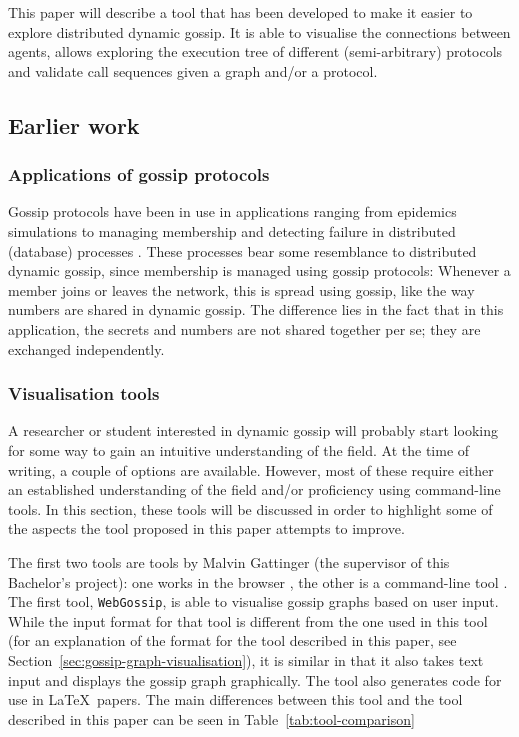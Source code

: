 This paper will describe a tool that has been developed to make it easier to explore distributed dynamic gossip.
It is able to visualise the connections between agents, allows exploring the execution tree of different (semi-arbitrary) protocols and validate call sequences given a graph and/or a protocol.

\subsection{Earlier work}

\subsubsection{Applications of gossip protocols}

Gossip protocols have been in use in applications ranging from epidemics simulations \addcite to managing membership and detecting failure in distributed (database) processes \parencite{decandia_dynamo_2007, das_swim_2002}.
These processes bear some resemblance to distributed dynamic gossip, since membership is managed using gossip protocols:
Whenever a member joins or leaves the network, this is spread using gossip, like the way numbers are shared in dynamic gossip.
The difference lies in the fact that in this application, the secrets and numbers are not shared together per se;
they are exchanged independently.

\subsubsection{Visualisation tools}

A researcher or student interested in dynamic gossip will probably start looking for some way to gain an intuitive understanding of the field.
At the time of writing, a couple of options are available.
However, most of these require either an established understanding of the field and/or proficiency using command-line tools.
In this section, these tools will be discussed in order to highlight some of the aspects the tool proposed in this paper attempts to improve.

The first two tools are tools by Malvin Gattinger (the supervisor of this Bachelor's project):
one works in the browser \parencite{gattinger_webgossip_nodate}, the other is a command-line tool \parencite{gattinger_m4lvingomoche_2020}. 
The first tool, \texttt{WebGossip}, is able to visualise gossip graphs based on user input.
While the input format for that tool is different from the one used in this tool
(for an explanation of the format for the tool described in this paper, see Section~\ref{sec:gossip-graph-visualisation}),
it is similar in that it also takes text input and displays the gossip graph graphically.
The tool also generates code for use in \LaTeX\ papers.
The main differences between this tool and the tool described in this paper can be seen in Table~\ref{tab:tool-comparison}

